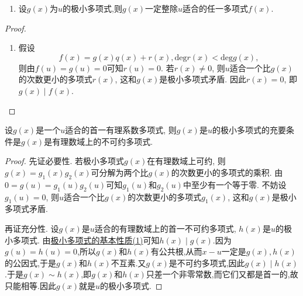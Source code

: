\documentclass[../../main.tex]{subfiles}%
\begin{document}
\begin{proposition}[极小多项式的基本性质]\label{proposition:极小多项式的基本性质}
\begin{enumerate}[(1)]
\item 设$g(x)$为$u$的极小多项式,则$g(x)$一定整除\(u\)适合的任一多项式\(f(x)\).
\end{enumerate}
\end{proposition}
\begin{proof}
\begin{enumerate}[(1)]
\item 假设
\[
f(x)=g(x)q(x)+r(x), \mathrm{deg }r(x)<\mathrm{deg }g(x),
\]
则由\(f(u)=g(u)=0\)可知\(r(u)=0\). 若\(r(x)\neq 0\), 则\(u\)适合一个比\(g(x)\)的次数更小的多项式\(r(x)\), 这和\(g(x)\)是极小多项式矛盾. 因此\(r(x)=0\), 即\(g(x)\mid f(x)\). 
\end{enumerate}
\end{proof}

\begin{proposition}[极小多项式式的充要条件]\label{proposition:极小多项式式的充要条件}
设\(g(x)\)是一个\(u\)适合的首一有理系数多项式, 则\(g(x)\)是\(u\)的极小多项式的充要条件是\(g(x)\)是有理数域上的不可约多项式.
\end{proposition}
\begin{proof}

先证必要性. 若极小多项式\(g(x)\)在有理数域上可约, 则\(g(x)=g_1(x)g_2(x)\)可分解为两个比\(g(x)\)的次数更小的多项式的乘积. 由\(0 = g(u)=g_1(u)g_2(u)\)可知\(g_1(u)\)和\(g_2(u)\)中至少有一个等于零. 不妨设\(g_1(u)=0\), 则\(u\)适合一个比\(g(x)\)的次数更小的多项式\(g_1(x)\), 这和\(g(x)\)是极小多项式矛盾. 

再证充分性. 设\(g(x)\)是\(u\)适合的有理数域上的首一不可约多项式, \(h(x)\)是\(u\)的极小多项式. 由\hyperref[proposition:极小多项式的基本性质]{极小多项式的基本性质(1)}可知\(h(x)\mid g(x)\).因为$g(u)=h(u)=0$,所以$g(x)$和$h(x)$有公共根,从而$x-u$一定是$g(x),h(x)$的公因式,于是$g(x)$和$h(x)$不互素.又\(g(x)\)是不可约多项式,因此$g(x)\mid h(x)$.于是$g(x)\sim h(x)$,即\(g(x)\)和\(h(x)\)只差一个非零常数,而它们又都是首一的,故只能相等.因此\(g(x)\)就是\(u\)的极小多项式.
\end{proof}
\end{document}
